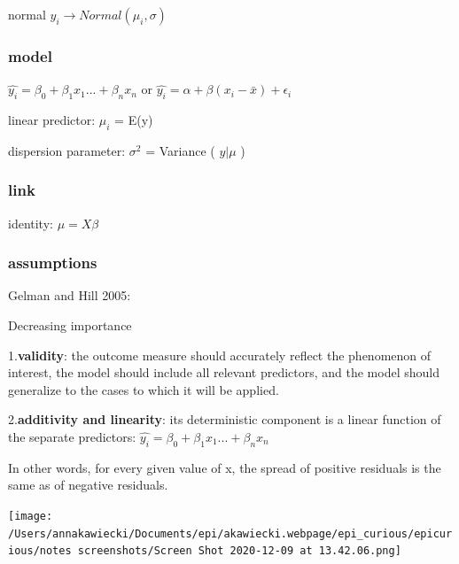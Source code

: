 \documentclass[
]{article}
\begin{document}
normal \(y_i \to Normal(\mu_i, \sigma)\)

\hypertarget{model}{%
\subsubsection{model}\label{model}}

\(\hat{y_i}=\beta_0 +\beta_1x_1...+\beta_n x_n\) or
\(\hat{y_i}=\alpha +\beta(x_i-\bar{x}) + \epsilon_i\)

linear predictor: \(\mu_i\) = E(y)

dispersion parameter: \(\sigma^2\) = Variance ( \(y | \mu\) )

\hypertarget{link}{%
\subsubsection{link}\label{link}}

identity: \(\mu = X \beta\)

\hypertarget{assumptions}{%
\subsubsection{assumptions}\label{assumptions}}

Gelman and Hill 2005:

Decreasing importance

1.\textbf{validity}: the outcome measure should accurately reflect the
phenomenon of interest, the model should include all relevant
predictors, and the model should generalize to the cases to which it
will be applied.

2.\textbf{additivity and linearity}: its deterministic component is a
linear function of the separate predictors:
\(\hat{y_i}=\beta_0 +\beta_1x_1...+\beta_n x_n\)

In other words, for every given value of x, the spread of positive
residuals is the same as of negative residuals.

\texttt{[image: /Users/annakawiecki/Documents/epi/akawiecki.webpage/epi\_curious/epicurious/notes screenshots/Screen Shot 2020-12-09 at 13.42.06.png]}
\end{document}
